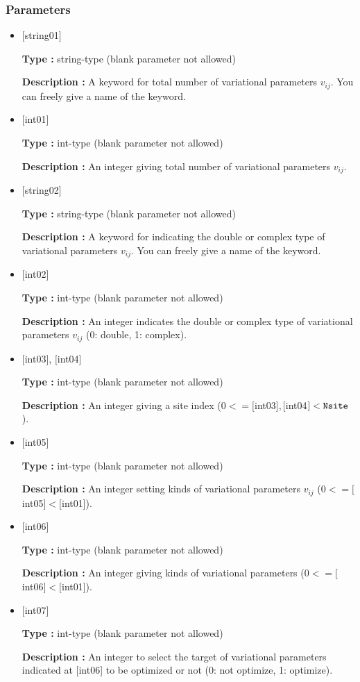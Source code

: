 \subsubsection{Parameters}
 \begin{itemize}

   \item  $[$string01$]$
   
    {\bf Type :} string-type (blank parameter not allowed)

   {\bf Description :} A keyword for total number of variational parameters $v_{ij}$. You can freely give a name of the keyword.


   \item  $[$int01$]$
   
    {\bf Type :} int-type (blank parameter not allowed)

   {\bf Description :} An integer giving total number of variational parameters $v_{ij}$.
   \item  $[$string02$]$
   
    {\bf Type :} string-type (blank parameter not allowed)

   {\bf Description :} A keyword for indicating the double or complex type of variational parameters $v_{ij}$. You can freely give a name of the keyword.

   \item  $[$int02$]$
   
    {\bf Type :} int-type (blank parameter not allowed)

   {\bf Description :} An integer indicates the double or complex type of variational parameters $v_{ij}$ (0: double, 1: complex). 

  \item  $[$int03$]$, $[$int04$]$
  
 {\bf Type :} int-type (blank parameter not allowed)

{\bf Description :} An integer giving a site index ($0<= [$int03$], [$int04$]<\verb|Nsite|$).
  
 \item  $[$int05$]$
   
   {\bf Type :} int-type (blank parameter not allowed)

  {\bf Description :}  An integer setting kinds of variational  parameters $v_{ij}$ ($0<= [$int05$]<[$int01]). 

 \item  $[$int06$]$
   
   {\bf Type :} int-type (blank parameter not allowed)

  {\bf Description :} An integer giving kinds of variational  parameters ($0<= [$int06$]<[$int01]).

 \item  $[$int07$]$
   
   {\bf Type :} int-type (blank parameter not allowed)

  {\bf Description :} An integer to select the target of variational parameters indicated at [int06] to be optimized or not (0: not optimize, 1: optimize).
  \end{itemize}

